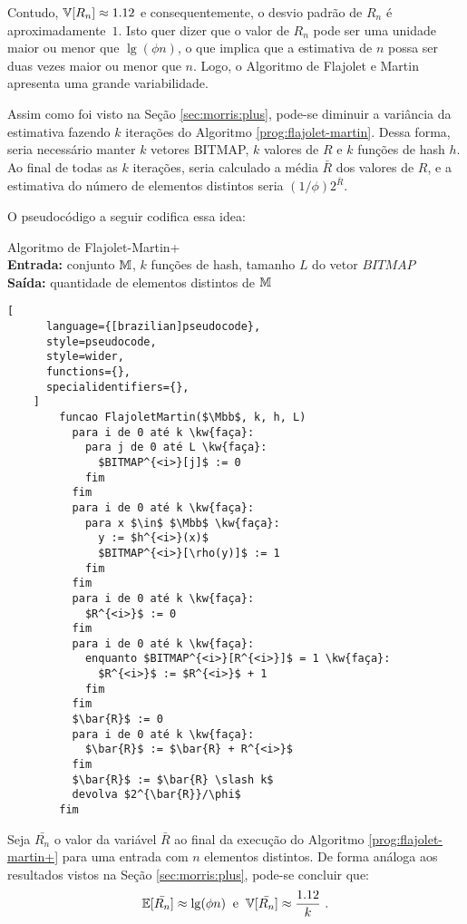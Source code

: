 Contudo, $\Vbb[R_n] \approx\nolinebreak 1.12$ e consequentemente, o desvio padrão de $R_n$ é aproximadamente~$1$. 
Isto quer dizer que o valor de $R_n$ pode ser uma unidade maior ou menor que $\lg(\phi n)$, o que implica que a 
estimativa de $n$ possa ser duas vezes maior ou menor que $n$. Logo, o Algoritmo de Flajolet e Martin apresenta uma 
grande variabilidade.

Assim como foi visto na Seção \ref{sec:morris:plus}, pode-se diminuir a variância da estimativa fazendo $k$ iterações 
do Algoritmo \ref{prog:flajolet-martin}. Dessa forma, seria necessário manter $k$ vetores BITMAP, $k$ valores de $R$ e 
$k$ funções de hash $h$. Ao final de todas as $k$ iterações, seria calculado a média $\bar{R}$ dos valores de $R$, e a 
estimativa do número de elementos distintos seria $(1 \slash \phi) 2^{\bar{R}}$.

O pseudocódigo a seguir codifica essa idea:

\begin{programruledcaption}{
  Algoritmo de Flajolet-Martin+
  \\ \textbf{Entrada:} conjunto $\mathbb{M}$, $k$ funções de hash, tamanho $L$ do vetor $BITMAP$ 
  \\ \textbf{Saída:} quantidade de elementos distintos de $\mathbb{M}$
  \label{prog:flajolet-martin+}
  }
    \begin{lstlisting}[
      language={[brazilian]pseudocode},
      style=pseudocode,
      style=wider,
      functions={},
      specialidentifiers={},
    ]
        funcao FlajoletMartin($\Mbb$, k, h, L)
          para i de 0 até k \kw{faça}:
            para j de 0 até L \kw{faça}:
              $BITMAP^{<i>}[j]$ := 0
            fim
          fim
          para i de 0 até k \kw{faça}:
            para x $\in$ $\Mbb$ \kw{faça}:
              y := $h^{<i>}(x)$
              $BITMAP^{<i>}[\rho(y)]$ := 1
            fim
          fim
          para i de 0 até k \kw{faça}:
            $R^{<i>}$ := 0
          fim
          para i de 0 até k \kw{faça}:
            enquanto $BITMAP^{<i>}[R^{<i>}]$ = 1 \kw{faça}:
              $R^{<i>}$ := $R^{<i>}$ + 1
            fim
          fim
          $\bar{R}$ := 0
          para i de 0 até k \kw{faça}:
            $\bar{R}$ := $\bar{R} + R^{<i>}$ 
          fim
          $\bar{R}$ := $\bar{R} \slash k$
          devolva $2^{\bar{R}}/\phi$
        fim
    \end{lstlisting}
  \end{programruledcaption}

Seja $\bar{R_n}$ o valor da variável $\bar{R}$ ao final da execução do Algoritmo \ref{prog:flajolet-martin+} para uma
entrada com $n$ elementos distintos. De forma análoga aos resultados vistos na Seção \ref{sec:morris:plus}, pode-se
concluir que:
\[ \Ebb[\bar{R_n}] \approx \lg(\phi n)  \; \; \text{e}  \; \; \Vbb[\bar{R_n}] \approx \frac{1.12}{k} \ . \]


